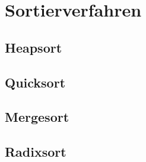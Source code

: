 \documentclass[german]{../spicker}
\begin{document}

\section{Sortierverfahren}
\subsection{Heapsort}

\subsection{Quicksort}

\subsection{Mergesort}

\subsection{Radixsort}


\printindex
\printindex[Beispiele]

\printbibliography
\end{document}

